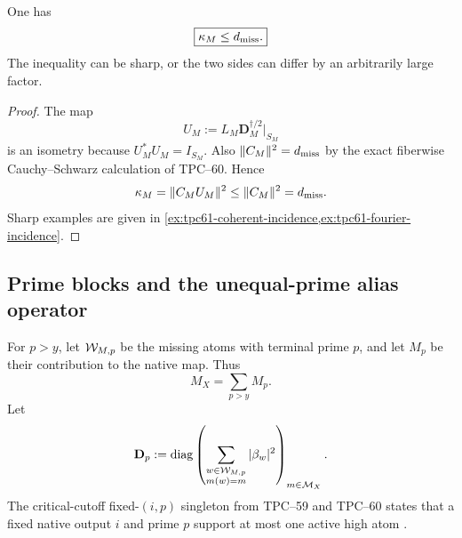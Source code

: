 \begin{corollary}
\label{cor:tpc61-kappa-below-degree}
One has
\begin{equation}
 \boxed{\kappa_M\le d_{\rm miss}.}
 \label{eq:tpc61-kappa-ambient-bound}
\end{equation}
The inequality can be sharp, or the two sides can differ by an arbitrarily
large factor.
\end{corollary}

\begin{proof}
The map
\[
 U_M:=L_M\mathbf D_M^{\dagger/2}|_{S_M}
\]
is an isometry because \(U_M^*U_M=I_{S_M}\).  Also
\(\|C_M\|^2=d_{\rm miss}\) by the exact fiberwise Cauchy--Schwarz
calculation of TPC--60.  Hence
\[
 \kappa_M
 =\|C_MU_M\|^2
 \le\|C_M\|^2=d_{\rm miss}.
\]
Sharp examples are given in
\cref{ex:tpc61-coherent-incidence,ex:tpc61-fourier-incidence}.
\end{proof}

\subsection{Prime blocks and the unequal-prime alias operator}

For \(p>y\), let \(\mathcal W_{M,p}\) be the missing atoms with terminal prime
\(p\), and let \(M_p\) be their contribution to the native map.  Thus
\begin{equation}
 M_X=\sum_{p>y}M_p.
 \label{eq:tpc61-prime-map-sum}
\end{equation}
Let
\begin{equation}
 \mathbf D_p
 :=\operatorname{diag}\left(
  \sum_{\substack{w\in\mathcal W_{M,p}\\m(w)=m}}|\beta_w|^2
 \right)_{m\in\mathcal M_X}.
 \label{eq:tpc61-prime-diagonal}
\end{equation}
The critical-cutoff fixed-\((i,p)\) singleton from TPC--59 and TPC--60
states that a fixed native output \(i\) and prime \(p\) support at most one
active high atom \citep{WangTPC59,WangTPC60}.

